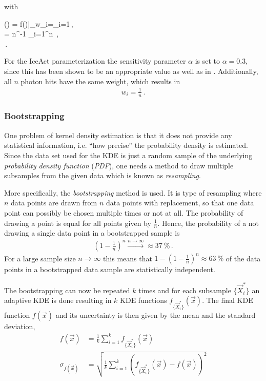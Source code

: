 with
\begin{vardescription}
	() = f()|_{w_i=\lambda_i=1}\,,\\
	 = n^{-1} \sum_{i=1}^{n} \,,\\
	\alpha\in[0,1]\,.
\end{vardescription}
For the IceAct parameterization the sensitivity parameter $\alpha$ is set to $\alpha=\num{0.3}$, since this has been shown to be an appropriate value as well as in \cite{kde:schoenen}. Additionally, all $n$ photon hits have the same weight, which results in \cite{kde:schoenen,kde:wangwang}
\begin{align}
	w_i = \frac{1}{n}\,.
\end{align}

\subsubsection{Bootstrapping}

One problem of kernel density estimation is that it does not provide any statistical information, i.e. \enquote{how precise} the probability density is estimated. Since the data set used for the KDE is just a random sample of the underlying \textit{probability density function} (\textit{PDF}), one needs a method to draw multiple subsamples from the given data which is known as \textit{resampling}.

More specifically, the \textit{bootstrapping} method is used. It is type of resampling where $n$ data points are drawn from $n$ data points with replacement, so that one data point can possibly be chosen multiple times or not at all. The probability of drawing a point is equal for all points given by $\frac{1}{n}$. Hence, the probability of a not drawing a single data point in a bootstrapped sample is
\begin{align}
	\left(1-\frac{1}{n}\right)^n \overset{n\to\infty}{\longrightarrow} \approx\SI{37}{\percent}\,.
\end{align}
For a large sample size $n\to\infty$ this means that $1-\left(1-\frac{1}{n}\right)^n\approx\SI{63}{\percent}$ of the data points in a bootstrapped data sample are statistically independent.

The bootstrapping can now be repeated $k$ times and for each subsample $\{\vec{X}_i^\ast\}$ an adaptive KDE is done resulting in $k$ KDE functions $f_{\{\vec{X}_i^\ast\}}(\vec{x})$. The final KDE function $f(\vec{x})$ and its uncertainty is then given by the mean and the standard deviation,~\cite{kde:bootstrapping,kde:schoenen}
\begin{subequations}
	\begin{align}
		f(\vec{x}) &= \frac{1}{k}\sum_{i=1}^{k} f_{\{\vec{X}_i^\ast\}}(\vec{x})\\
		\sigma_{f(\vec{x})}	&= \sqrt{\frac{1}{k}\sum_{i=1}^{k}\left(f_{\{\vec{X}_i^\ast\}}(\vec{x}) - f(\vec{x})\right)^2}
	\end{align}
\end{subequations}

